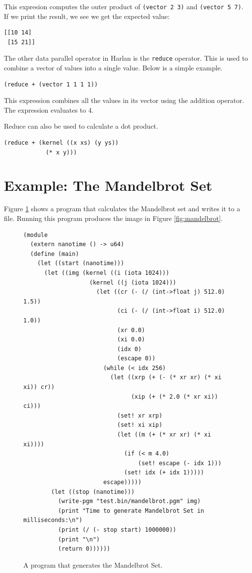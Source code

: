 \documentclass[oneside]{report}
\begin{document}
This expresion computes the outer product of \lstinline{(vector 2 3)}
and \lstinline{(vector 5 7)}. If we print the result, we see we get
the expected value:

\begin{verbatim}
[[10 14]
 [15 21]]
\end{verbatim}

The other data parallel operator in Harlan is the \lstinline{reduce}
operator. This is used to combine a vector of values into a single
value. Below is a simple example.

\begin{lstlisting}
(reduce + (vector 1 1 1 1))  
\end{lstlisting}

This expression combines all the values in its vector using the
addition operator. The expression evaluates to 4.

Reduce can also be used to calculate a dot product.

\begin{lstlisting}
(reduce + (kernel ((x xs) (y ys))
            (* x y)))
\end{lstlisting}

\section{Example: The Mandelbrot Set}

Figure \ref{fig:mandelbrot-code} shows a program that calculates the
Mandelbrot set and writes it to a file.  Running this program produces
the image in Figure \ref{fig:mandelbrot}.

\begin{figure}
\begin{lstlisting}
(module
  (extern nanotime () -> u64)
  (define (main)
    (let ((start (nanotime)))
      (let ((img (kernel ((i (iota 1024)))
                   (kernel ((j (iota 1024)))
                     (let ((cr (- (/ (int->float j) 512.0) 1.5))
                           (ci (- (/ (int->float i) 512.0) 1.0))
                           (xr 0.0)
                           (xi 0.0)
                           (idx 0)
                           (escape 0))
                       (while (< idx 256)
                         (let ((xrp (+ (- (* xr xr) (* xi xi)) cr))
                               (xip (+ (* 2.0 (* xr xi)) ci)))
                           (set! xr xrp)
                           (set! xi xip)
                           (let ((m (+ (* xr xr) (* xi xi))))
                             (if (< m 4.0)
                                 (set! escape (- idx 1)))
                             (set! idx (+ idx 1)))))
                       escape)))))
        (let ((stop (nanotime)))
          (write-pgm "test.bin/mandelbrot.pgm" img)
          (print "Time to generate Mandelbrot Set in milliseconds:\n")
          (print (/ (- stop start) 1000000))
          (print "\n")
          (return 0))))))
\end{lstlisting}
  
  \caption{A program that generates the Mandelbrot Set.}
  \label{fig:mandelbrot-code}
\end{figure}
\end{document}
